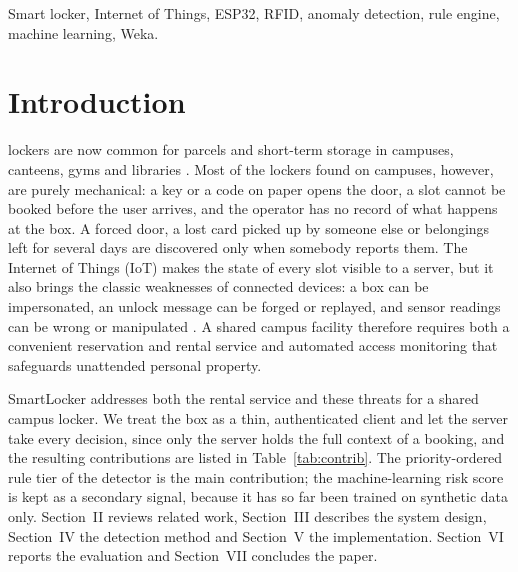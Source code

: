 \begin{IEEEkeywords}
Smart locker, Internet of Things, ESP32, RFID, anomaly detection, rule engine, machine learning, Weka.
\end{IEEEkeywords}

\section{Introduction}

 lockers are now common for parcels and short-term storage in campuses, canteens, gyms
and libraries \cite{iwan2016parcel}. Most of the lockers found on campuses, however, are purely mechanical: a key or a
code on paper opens the door, a slot cannot be booked before the user arrives, and the operator has no record of what
happens at the box. A forced door, a lost card picked up by someone else or belongings left for several days are
discovered only when somebody reports them. The Internet of Things (IoT) \cite{alfuqaha2015iot} makes the state of
every slot visible to a server, but it also brings the classic weaknesses of connected devices: a box can be
impersonated, an unlock message can be forged or replayed, and sensor readings can be wrong or manipulated
\cite{sicari2015security, roman2013features}. A shared campus facility therefore requires both a convenient reservation
and rental service and automated access monitoring that safeguards unattended personal property.

SmartLocker addresses both the rental service and these threats for a shared campus locker. We treat the box as a thin,
authenticated client and let the server take every decision, since only the server holds the full context of a
booking, and the resulting contributions are listed in Table~\ref{tab:contrib}. The priority-ordered rule tier of the
detector is the main contribution; the machine-learning risk score is kept as a secondary signal, because it has so far
been trained on synthetic data only. Section~II reviews related work, Section~III describes the system design,
Section~IV the detection method and Section~V the implementation. Section~VI reports the evaluation and Section~VII
concludes the paper.

